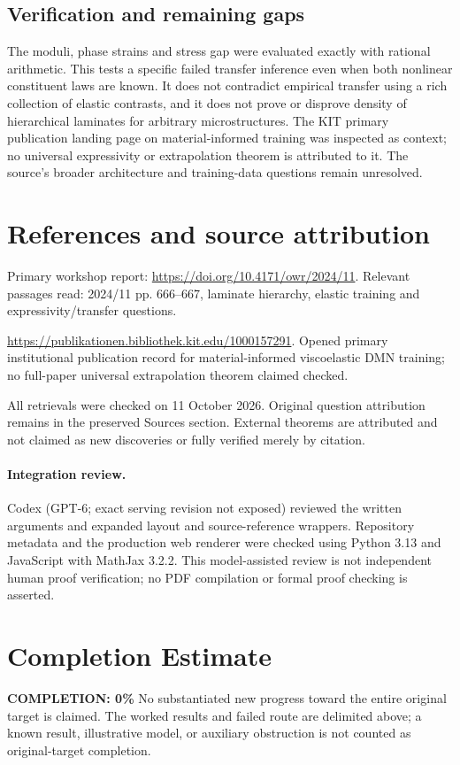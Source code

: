 \documentclass[11pt]{article}
\begin{document}
\subsection{Verification and remaining gaps}
The moduli, phase strains and stress gap were evaluated exactly with rational arithmetic. This tests a specific failed transfer inference even when both nonlinear constituent laws are known. It does not contradict empirical transfer using a rich collection of elastic contrasts, and it does not prove or disprove density of hierarchical laminates for arbitrary microstructures. The KIT primary publication landing page on material-informed training was inspected as context; no universal expressivity or extrapolation theorem is attributed to it. The source's broader architecture and training-data questions remain unresolved.

\section{References and source attribution}
Primary workshop report: \url{https://doi.org/10.4171/owr/2024/11}. Relevant passages read: 2024/11 pp. 666--667, laminate hierarchy, elastic training and expressivity/transfer questions.

\url{https://publikationen.bibliothek.kit.edu/1000157291}. Opened primary institutional publication record for material-informed viscoelastic DMN training; no full-paper universal extrapolation theorem claimed checked.

All retrievals were checked on 11 October 2026. Original question attribution remains in the preserved Sources section. External theorems are attributed and not claimed as new discoveries or fully verified merely by citation.


\paragraph{Integration review.} Codex (GPT-6; exact serving revision not exposed) reviewed the written arguments and expanded layout and source-reference wrappers. Repository metadata and the production web renderer were checked using Python 3.13 and JavaScript with MathJax 3.2.2. This model-assisted review is not independent human proof verification; no PDF compilation or formal proof checking is asserted.

\section{Completion Estimate}
\noindent\textbf{COMPLETION: 0\%}
No substantiated new progress toward the entire original target is claimed. The worked results and failed route are delimited above; a known result, illustrative model, or auxiliary obstruction is not counted as original-target completion.
\end{document}
